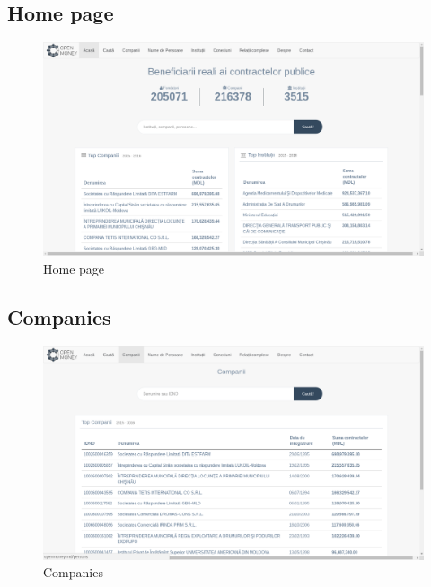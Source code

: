 \documentclass[12pt]{article}
\begin{document}
\newpage
\subsection{Home page}
\begin{figure}[!ht] 
	\renewcommand\thefigure{1} %
	\centering 
	\includegraphics[width=17cm]{home.png} 
	\caption{ Home page }\label{fig4} 
	\end{figure}
	
\newpage
\subsection{Companies}
	\begin{figure}[!ht] 
	\renewcommand\thefigure{2} %
	\centering 
	\includegraphics[width=17cm]{companies.png} 
	\caption{ Companies }\label{fig4} 
	\end{figure}
	
\end{document}
